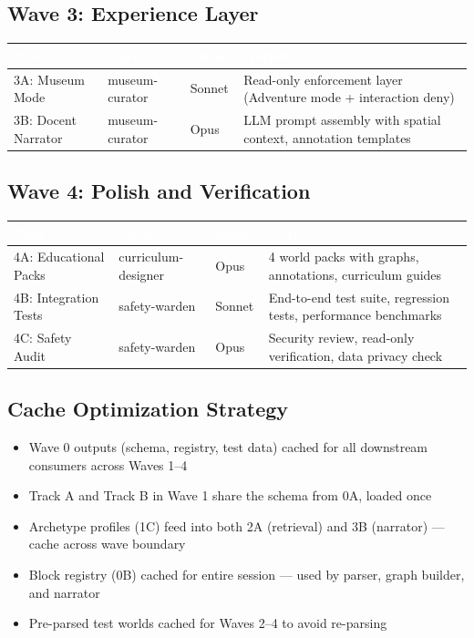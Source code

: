 \documentclass[11pt,letterpaper]{article}
\newcommand{\tableheader}[1]{\textbf{\sffamily\textcolor{white}{#1}}}
\begin{document}
\subsection{Wave 3: Experience Layer}

\begin{center}
\begin{tabularx}{\textwidth}{L{2.5cm}L{2cm}C{1.5cm}X}
\toprule
{}
\tableheader{Task} & \tableheader{Agent} & \tableheader{Model} & \tableheader{Output} \\
\midrule
3A: Museum Mode & museum-curator & Sonnet & Read-only enforcement layer (Adventure mode + interaction deny) \\
3B: Docent Narrator & museum-curator & Opus & LLM prompt assembly with spatial context, annotation templates \\
\bottomrule
\end{tabularx}
\end{center}

\subsection{Wave 4: Polish and Verification}

\begin{center}
\begin{tabularx}{\textwidth}{L{2.5cm}L{2cm}C{1.5cm}X}
\toprule
{}
\tableheader{Task} & \tableheader{Agent} & \tableheader{Model} & \tableheader{Output} \\
\midrule
4A: Educational Packs & curriculum-designer & Opus & 4 world packs with graphs, annotations, curriculum guides \\
4B: Integration Tests & safety-warden & Sonnet & End-to-end test suite, regression tests, performance benchmarks \\
4C: Safety Audit & safety-warden & Opus & Security review, read-only verification, data privacy check \\
\bottomrule
\end{tabularx}
\end{center}

\subsection{Cache Optimization Strategy}
\begin{itemize}[leftmargin=2em]
\item Wave 0 outputs (schema, registry, test data) cached for all downstream consumers across Waves 1--4
\item Track A and Track B in Wave 1 share the schema from 0A, loaded once
\item Archetype profiles (1C) feed into both 2A (retrieval) and 3B (narrator) --- cache across wave boundary
\item Block registry (0B) cached for entire session --- used by parser, graph builder, and narrator
\item Pre-parsed test worlds cached for Waves 2--4 to avoid re-parsing
\end{itemize}
\end{document}
